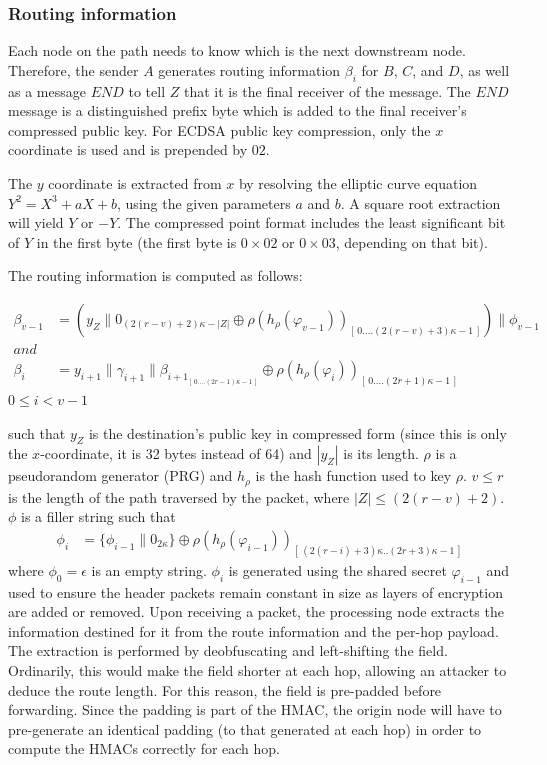 \subsubsection{Routing information}
Each node on the path needs to know which is the next downstream node. Therefore, the sender $A$ generates routing information $\beta_i$ for $B$, $C$, and $D$, as well as a message $END$ to tell $Z$ that it is the final receiver of the message. 
The $END$ message is a distinguished prefix byte which is added to the final receiver's compressed public key.
For ECDSA public key compression, only the $x$ coordinate is used and is prepended by $02$. 

The $y$ coordinate is extracted from $x$ by resolving the elliptic curve equation $Y^2=X^3+aX+b$, using the given parameters $a$ and $b$. A square root extraction will yield $Y$ or $-Y$. The compressed point format includes the least significant bit of $Y$ in the first byte (the first byte is $0\times02$ or $0\times03$, depending on that bit).

The routing information is computed as follows:

\begin{align}  
    \beta_{v-1} &=(y_Z\|0_{(2(r-v)+2)\kappa-|Z|}\oplus \rho(h_{\rho}(\varphi_{v-1}))_{[ \,0....(2(r-v)+3)\kappa-1\,]})\|\phi_{v-1}\\
    and &\nonumber \\
    \beta_i &=y_{i+1}\|\gamma_{i+1}\|\beta_{{i+1}_{[ \,0....(2r-1)\kappa-1\,] }}\oplus \rho(h_{\rho}(\varphi_{i}))_{[ \,0....(2r+1)\kappa-1\,]} 
    \label{eq:2}
\end{align}
$0\le i < v-1$

such that $y_Z$ is the destination's public key in compressed form (since this is only the $x$-coordinate, it is 32 bytes instead of 64) and $|y_Z|$ is its length. $\rho$ is a pseudorandom generator (PRG) and $h_{\rho}$ is the hash function used to key $\rho$.
$v\leq r$ is the length of the path traversed by the packet, where $|Z| \leq (2(r - v) + 2)$. $\phi$ is a filler string such that
\begin{align}  
    \phi_i&=\{ \phi_{i-1}\|0_{2\kappa}\}\oplus \rho(h_{\rho}(\varphi_{i-1}))_{[ \,(2(r-i)+3)\kappa..(2r+3)\kappa-1\,]}
\end{align}
where $\phi_0=\epsilon$ is an empty string. $\phi_i$ is generated using the shared secret $\varphi_{i-1}$ and used to ensure the header packets remain constant in size as layers of encryption are added or removed. Upon receiving a packet, the processing node extracts the information destined for it from the route information and the per-hop payload. The extraction is performed by deobfuscating and left-shifting the field. Ordinarily, this would make the field shorter at each hop, allowing an attacker to deduce the route length. For this reason, the field is pre-padded before forwarding. Since the padding is part of the HMAC, the origin node will have to pre-generate an identical padding (to that generated at each hop) in order to compute the HMACs correctly for each hop.
    
